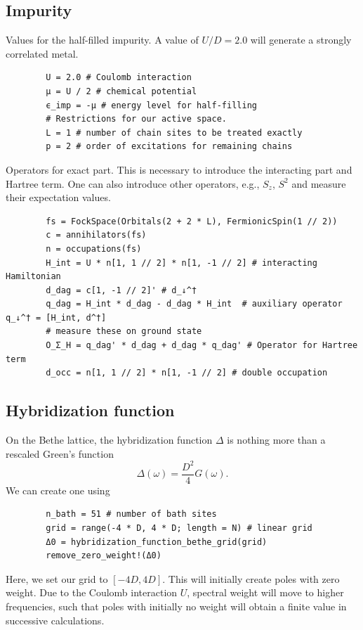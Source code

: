 \subsection{Impurity}
Values for the half-filled impurity.
A value of $U/D=2.0$ will generate a strongly correlated metal.
\begin{verbatim}
        U = 2.0 # Coulomb interaction
        μ = U / 2 # chemical potential
        ϵ_imp = -μ # energy level for half-filling
        # Restrictions for our active space.
        L = 1 # number of chain sites to be treated exactly
        p = 2 # order of excitations for remaining chains
\end{verbatim}
Operators for exact part.
This is necessary to introduce the interacting part and Hartree term.
One can also introduce other operators, e.g., $S_z$, $S^2$
and measure their expectation values.
\begin{verbatim}
        fs = FockSpace(Orbitals(2 + 2 * L), FermionicSpin(1 // 2))
        c = annihilators(fs)
        n = occupations(fs)
        H_int = U * n[1, 1 // 2] * n[1, -1 // 2] # interacting Hamiltonian
        d_dag = c[1, -1 // 2]' # d_↓^†
        q_dag = H_int * d_dag - d_dag * H_int  # auxiliary operator q_↓^† = [H_int, d^†]
        # measure these on ground state
        O_Σ_H = q_dag' * d_dag + d_dag * q_dag' # Operator for Hartree term
        d_occ = n[1, 1 // 2] * n[1, -1 // 2] # double occupation
\end{verbatim}

\subsection{Hybridization function}

On the Bethe lattice,
the hybridization function $Δ$ is nothing more than a rescaled Green's function
\begin{equation}
    \Delta(\omega) = \frac{D^2}{4} G(\omega).
\end{equation}
We can create one using
\begin{verbatim}
        n_bath = 51 # number of bath sites
        grid = range(-4 * D, 4 * D; length = N) # linear grid
        Δ0 = hybridization_function_bethe_grid(grid)
        remove_zero_weight!(Δ0)
\end{verbatim}
Here, we set our grid to $[-4D, 4D]$.
This will initially create poles with zero weight.
Due to the Coulomb interaction $U$, spectral weight will move to higher frequencies,
such that poles with initially no weight will obtain a finite value
in successive calculations.

